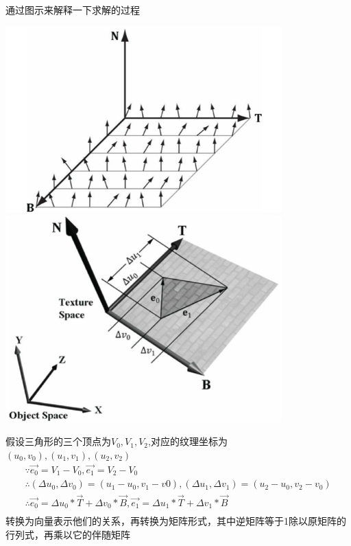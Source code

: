 \par
通过图示来解释一下求解的过程
\begin{center}
    \includegraphics[width=0.8\textwidth]{images/normal_map_tnb.png}
    \includegraphics[width=0.8\textwidth]{images/normal_map_tnb_in_object_space.png}
\end{center}
假设三角形的三个顶点为$V_{0},V_{1},V_{2}$,对应的纹理坐标为$(u_{0},v_{0}),(u_{1},v_{1}),(u_{2},v_{2})$
\begin{gather*}
    \because \overrightarrow{e_{0}} = V_{1} - V_{0}, \overrightarrow{e_{1}} = V_{2} - V_{0} \\ 
    \therefore (\Delta u_{0},\Delta v_{0}) = (u_{1} - u_{0}, v_{1} - v{0}),
    (\Delta u_{1}, \Delta v_{1}) = (u_{2} - u_{0}, v_{2} - v_{0}) \\ 
    \therefore \overrightarrow{e_{0}} = \Delta u_{0} \ast \overrightarrow{T} + \Delta v_{0} \ast \overrightarrow{B}, 
    \overrightarrow{e_{1}} = \Delta u_{1} \ast \overrightarrow{T} + \Delta v_{1} \ast \overrightarrow{B} \\    
\end{gather*}
转换为向量表示他们的关系，再转换为矩阵形式，其中逆矩阵等于1除以原矩阵的行列式，再乘以它的伴随矩阵
